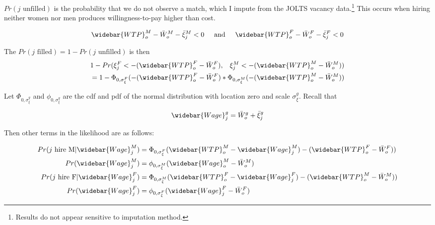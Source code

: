 \documentclass[12pt]{article}
\begin{document}
$Pr(\text{$j$ unfilled}) $ is the probability that we do not observe a match, which I impute from the JOLTS vacancy data.\footnote{Results do not appear sensitive to imputation method.} This occurs when hiring neither women nor men produces willingness-to-pay higher than cost.

\begin{align*}
 \widebar{WTP}^M_o - \bar{W}^M_o - \bar{\xi}^M_j < 0 \hspace{5mm} \text{and} \hspace{5mm} \widebar{WTP}^F_o - \bar{W}^F_o -  \bar{\xi}^F_j < 0 \\
\end{align*}

The $Pr( \text{$j$ filled}) = 1 - Pr( \text{$j$ unfilled}) $ is then
\begin{align*}
1- Pr(\xi^F_j< -(\widebar{WTP}^F_o - \bar{W}^F_o), \hspace{3mm} \xi^M_j< -(\widebar{WTP}^M_o - \bar{W}^M_o )) & \\
= 1 - \Phi_{0,\sigma^F_{\xi}}(-(\widebar{WTP}^F_o - \bar{W}^F_o)* \Phi_{0,\sigma^M_{\xi}}(-(\widebar{WTP}^M_o - \bar{W}^M_o))
\end{align*}

Let $\Phi_{0,\sigma^g_{\xi}}$ and $\phi_{0,\sigma^g_{\xi}}$ are the cdf and pdf of the normal distribution with location zero and scale $\sigma^g_{\xi}$. Recall that

$$ \widebar{Wage}^g_j = \bar{W}^g_o + \bar{\xi}^g_j $$

Then other terms in the likelihood are as follows:

\begin{align*}
Pr(\text{$j$ hire M} | \widebar{Wage}^M_{j} ) &= \Phi_{0,\sigma^F_{\xi}}( \widebar{WTP}^M_o -  \widebar{Wage}^M_j) - (\widebar{WTP}^F_o - \bar{W}^F_o))  \\
Pr(\widebar{Wage}^M_{j} ) &= \phi_{0,\sigma^M_{\xi}}( \widebar{Wage}^M_o - \bar{W}^M_o)  \\
Pr(\text{$j$ hire F} | \widebar{Wage}^F_{j}) &= \Phi_{0,\sigma^M_{\xi}}( \widebar{WTP}^F_o -  \widebar{Wage}^F_j) - (\widebar{WTP}^M_o - \bar{W}^M_o))  \\
Pr(\widebar{Wage}^F_{j}) &=  \phi_{0,\sigma^F_{\xi}}( \widebar{Wage}^F_j - \bar{W}^F_o)  \\
\end{align*}
\end{document}
